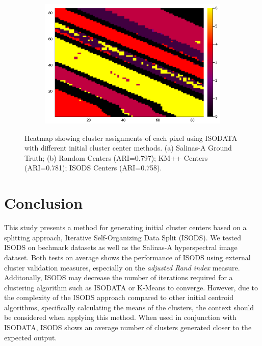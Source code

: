 \documentclass[a4paper, 10pt]{article}
\begin{document}
\begin{figure}[ht]
\begin{subfigure}[b]{0.24\textwidth}
            \label{fig:salinask}
      \end{subfigure}
      \begin{subfigure}[b]{0.24\textwidth}
            \centering
            \includegraphics[width=\linewidth]{iisodata.png}
            \label{fig:salinasi}
      \end{subfigure}\hfill \caption{Heatmap showing cluster assignments of each
            pixel using ISODATA with different initial cluster center methods.
            (a) Salinas-A Ground Truth; (b) Random Centers (ARI=0.797); KM++
            Centers (ARI=0.781); ISODS Centers (ARI=0.758).}
      \label{fig:salinas}
\end{figure}


\section{Conclusion}
This study presents a method for generating initial cluster centers based on a
splitting approach, Iterative Self-Organizing Data Split (ISODS). We tested ISODS on
bechmark datasets as well as the Salinas-A hyperspectral image dataset. Both
tests on average shows the performance of ISODS using external cluster
validation measures, especially on the \textit{adjusted Rand index} measure.
Additonally, ISODS may decrease the number of iterations required for a
clustering algorithm such as ISODATA or K-Means to converge. However, due to the
complexity of the ISODS approach compared to other initial centroid algorithms,
specifically calculating the means of the clusters, the context should be
considered when applying this method. When used in conjunction with ISODATA,
ISODS shows an average number of clusters generated closer to the expected
output.
\end{document}
